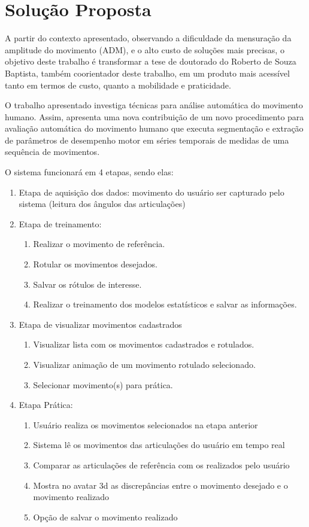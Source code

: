 \section{Solução Proposta}
\label{Sec:SolucaoProposta}
  A partir do contexto apresentado, observando a dificuldade da mensuração da
amplitude do movimento (ADM), e o alto custo de soluções mais precisas, o
objetivo deste trabalho é transformar a tese de doutorado do Roberto de Souza
Baptista, também coorientador deste trabalho, em um produto mais acessível
tanto em termos de custo, quanto a mobilidade e praticidade.

  O trabalho apresentado investiga técnicas para análise automática do
movimento humano. Assim, apresenta uma nova contribuição de um novo
procedimento para avaliação automática do movimento humano que executa
segmentação e extração de parâmetros de desempenho motor em séries temporais
de medidas de uma sequência de movimentos.

  O sistema funcionará em 4 etapas, sendo elas:
  \begin{enumerate}
  \item Etapa de aquisição dos dados: movimento do usuário ser capturado pelo sistema (leitura dos ângulos das articulações)
  \item Etapa de treinamento:
    \begin{enumerate}
    \item Realizar o movimento de referência.
    \item Rotular os movimentos desejados.
    \item Salvar os rótulos de interesse.
    \item Realizar o treinamento dos modelos estatísticos e salvar as informações.
    \end{enumerate}
  \item Etapa de visualizar movimentos cadastrados
    \begin{enumerate}
    \item Visualizar lista com os movimentos cadastrados e rotulados.
    \item Visualizar animação de um movimento rotulado selecionado.
    \item Selecionar movimento(s) para prática.
  \end{enumerate}
  \item Etapa Prática:
    \begin{enumerate}
    \item Usuário realiza os movimentos selecionados na etapa anterior
    \item Sistema lê os movimentos das articulações do usuário em tempo real
    \item Comparar as articulações de referência com os realizados pelo usuário
    \item Mostra no avatar 3d as discrepâncias entre o movimento desejado e o movimento realizado
    \item Opção de salvar o movimento realizado
    \end{enumerate}
  \end{enumerate}
